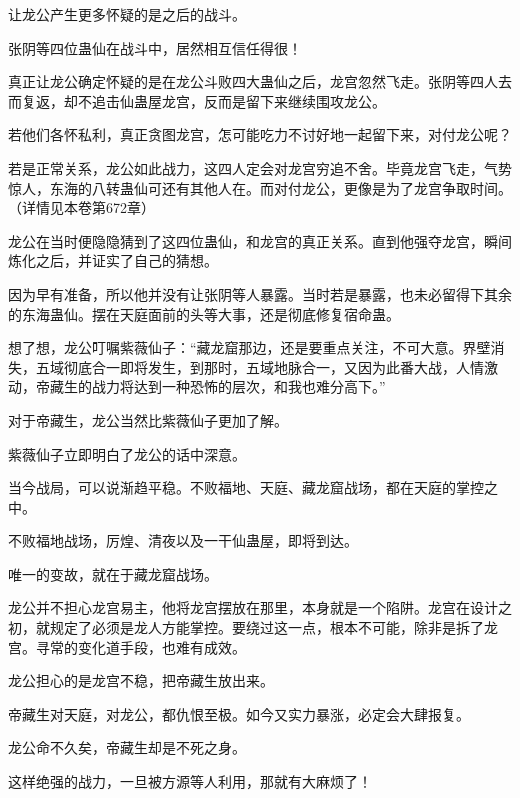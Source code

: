 \begin{this_body}
让龙公产生更多怀疑的是之后的战斗。

张阴等四位蛊仙在战斗中，居然相互信任得很！

真正让龙公确定怀疑的是在龙公斗败四大蛊仙之后，龙宫忽然飞走。张阴等四人去而复返，却不追击仙蛊屋龙宫，反而是留下来继续围攻龙公。

若他们各怀私利，真正贪图龙宫，怎可能吃力不讨好地一起留下来，对付龙公呢？

若是正常关系，龙公如此战力，这四人定会对龙宫穷追不舍。毕竟龙宫飞走，气势惊人，东海的八转蛊仙可还有其他人在。而对付龙公，更像是为了龙宫争取时间。（详情见本卷第672章）

龙公在当时便隐隐猜到了这四位蛊仙，和龙宫的真正关系。直到他强夺龙宫，瞬间炼化之后，并证实了自己的猜想。

因为早有准备，所以他并没有让张阴等人暴露。当时若是暴露，也未必留得下其余的东海蛊仙。摆在天庭面前的头等大事，还是彻底修复宿命蛊。

想了想，龙公叮嘱紫薇仙子：“藏龙窟那边，还是要重点关注，不可大意。界壁消失，五域彻底合一即将发生，到那时，五域地脉合一，又因为此番大战，人情激动，帝藏生的战力将达到一种恐怖的层次，和我也难分高下。”

对于帝藏生，龙公当然比紫薇仙子更加了解。

紫薇仙子立即明白了龙公的话中深意。

当今战局，可以说渐趋平稳。不败福地、天庭、藏龙窟战场，都在天庭的掌控之中。

不败福地战场，厉煌、清夜以及一干仙蛊屋，即将到达。

唯一的变故，就在于藏龙窟战场。

龙公并不担心龙宫易主，他将龙宫摆放在那里，本身就是一个陷阱。龙宫在设计之初，就规定了必须是龙人方能掌控。要绕过这一点，根本不可能，除非是拆了龙宫。寻常的变化道手段，也难有成效。

龙公担心的是龙宫不稳，把帝藏生放出来。

帝藏生对天庭，对龙公，都仇恨至极。如今又实力暴涨，必定会大肆报复。

龙公命不久矣，帝藏生却是不死之身。

这样绝强的战力，一旦被方源等人利用，那就有大麻烦了！

\end{this_body}

